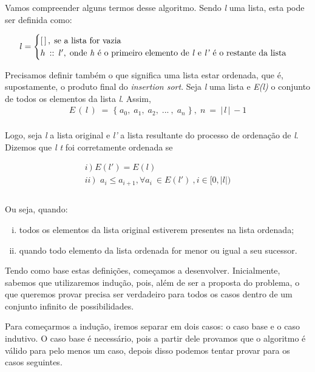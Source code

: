 \documentclass[a4paper, 10pt]{article}
\begin{document}
Vamos compreender alguns termos desse algoritmo. Sendo \textit{l} uma lista, esta pode ser definida como:

	\begin{equation*}
		l =
        \begin{cases}
        	[\,]\,,\; \text{se a lista for vazia}\\
            h\: :: \: l',\; \text{onde \textit{h} é o primeiro elemento de \textit{l} e \textit{l'} é o restante da lista} \\
        \end{cases}
	\end{equation*}

Precisamos definir também o que significa uma lista estar ordenada, que é, supostamente, o produto final do \textit{insertion sort}. Seja \textit{l}
uma lista e \textit{E(l)} o conjunto de todos os elementos da lista \textit{l}. Assim,
\begin{align*}
	E\,(\,l\,)\;=\; \{\;a_0,\;a_1,\;a_2,\;...\:,\;a_n\;\}\:,\;n\:=\:|\,l\,|\,-1
\end{align*}
\\
Logo, seja \textit{l} a lista original e \textit{l'} a lista resultante do processo de ordenação de \textit{l}. Dizemos que \textit{l t} foi corretamente ordenada se

\begin{gather*}
   i\,)\;E(l')=E(l) \\
   ii\,)\;\; a_i \leq a_{i+1}, \forall a_i \: \in E(l') \: , i\in [0,|l|) \\ 
\end{gather*}
\\
Ou seja, quando:
\begin{enumerate}[i)]
	\item todos os elementos da lista original estiverem presentes na lista ordenada;
    \item quando todo elemento da lista ordenada for menor ou igual a seu sucessor.
\end{enumerate}

Tendo como base estas definições, começamos a desenvolver. Inicialmente, sabemos que utilizaremos indução, pois, além de ser a proposta do problema, o que queremos provar precisa ser verdadeiro para todos os casos
dentro de um conjunto infinito de possibilidades.
	
Para começarmos a indução, iremos separar em dois casos: o caso base e o caso indutivo. O caso base é necessário, pois a partir dele provamos que o algoritmo é válido para pelo menos um caso, depois disso podemos tentar provar para os casos seguintes.\\
\end{document}
